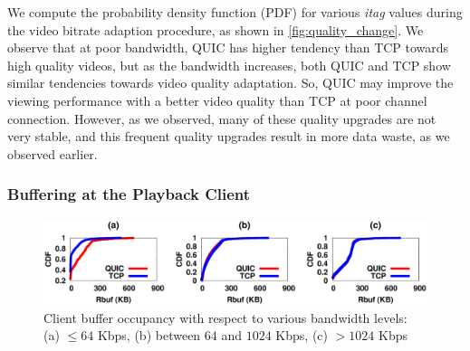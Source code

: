 We compute the probability density function (PDF) for various \textit{itag} values during the video bitrate adaption procedure, as shown in \fig\ref{fig:quality_change}. 
We observe that at poor bandwidth, QUIC has higher tendency than TCP towards high quality videos, but as the bandwidth increases, both QUIC and TCP show similar tendencies towards video quality adaptation. So, QUIC may improve the viewing performance with a better video quality than TCP  at poor channel connection. However, as we observed, many of these quality upgrades are not very stable, and this frequent quality upgrades result in more data waste, as we observed earlier. 

\subsubsection{Buffering at the Playback Client}

\begin{figure}[!t]
	\captionsetup[subfigure]{}
	\begin{center}
        \includegraphics[width=\linewidth]{img/plotdata/CDF/Rbuf/plot_rbuf_bucket123}
		\caption{\label{fig:rbuf}Client buffer occupancy with respect to various bandwidth levels: (a) $\leq 64$ Kbps, (b)  between $64$ and $1024$ Kbps, (c) $> 1024$ Kbps}
	\end{center}
\end{figure}


